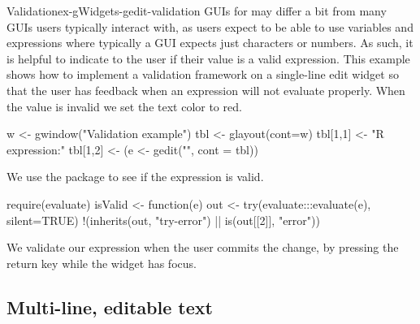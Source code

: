 \begin{example}{Validation}{ex-gWidgets-gedit-validation}
GUIs for \R\/ may differ a bit from many GUIs users typically
interact with, as \R\/ users expect to be able to use variables and
expressions where typically a GUI expects just characters or
numbers. As such, it is helpful to indicate to the user if their value
is a valid expression. This example shows how to implement a
validation framework on a single-line edit widget so that the user has
feedback when an expression will not evaluate properly.  When the
value is invalid we set the text color to red.


\begin{Schunk}
\begin{Sinput}
 w <- gwindow("Validation example")
 tbl <- glayout(cont=w)
 tbl[1,1] <- "R expression:"
 tbl[1,2] <- (e <- gedit("", cont = tbl))
\end{Sinput}
\end{Schunk}


We use the  package to see if the expression is valid.
\begin{Schunk}
\begin{Sinput}
 require(evaluate)
 isValid <- function(e) {
   out <- try(evaluate:::evaluate(e), silent=TRUE)
   !(inherits(out, "try-error") || 
     is(out[[2]], "error"))
 }
\end{Sinput}
\end{Schunk}
%

We validate our expression when the user commits the change, by
pressing the return key while the widget has focus. 


\begin{Schunk}
\end{Schunk}

\end{example}

\subsection{Multi-line, editable text}
\label{sec:gWidgets-multi-line-editable}

